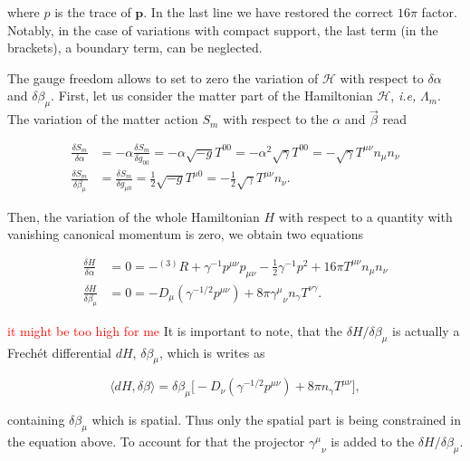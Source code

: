\documentclass[11pt,a4paper,headinclude=true,DIV=14,BCOR=8mm,chapterprefix,listof=totoc,twoside,openright,abstracton]{scrbook}
\newcommand{\red}[1]{\textcolor{red}{#1}}
\begin{document}
where $p$ is the trace of $\boldsymbol{p}$. In the last line we have restored the correct $16\pi$ factor. Notably, in the case of variations with compact support, the last term (in the brackets), a boundary term, can be neglected. 

The gauge freedom allows to set to zero the variation of $\mathcal{H}$ with respect to $\delta \alpha$ and $\delta \beta_{\mu}$. First, let us consider the matter part of the Hamiltonian $\mathcal{H}$, \textit{i.e,} $\Lambda_m$. The variation of the matter action $S_m$ with respect to the $\alpha$ and $\vec{\beta}$ read

\begin{align}
\frac{\delta S_m}{\delta \alpha} &=-\alpha\frac{\delta S_m}{\delta g_{00}} = -\alpha\sqrt{-g}T^{00} = -\alpha^2\sqrt{\gamma}T^{00} = -\sqrt{\gamma}T^{\mu\nu}n_{\mu}n_{\nu} \\
\frac{\delta S_m}{\delta \beta_{\mu}} &= \frac{\delta S_m}{\delta g_{\mu 0}} =\frac{1}{2}\sqrt{-g}T^{\mu 0} = -\frac{1}{2} \sqrt{\gamma}T^{\mu\nu}n_{\nu}.
\end{align}

Then, the variation of the whole Hamiltonian $H$ with respect to a quantity with vanishing canonical momentum is zero, we obtain two equations 

\begin{align}
\frac{\delta H}{\delta \alpha} &= 0 = -{^{(3)}R} + \gamma^{-1}p^{\mu\nu}p_{\mu\nu}-\frac{1}{2}\gamma^{-1}p^2 + 16\pi T^{\mu\nu}n_{\mu}n_{\nu} \\
\frac{\delta H}{\delta \beta_{\mu}} &= 0 = - D_{\mu}(\gamma^{-1/2}p^{\mu\nu}) + 8\pi{\gamma^{\mu}}_{\nu}n_{\gamma}T^{\nu\gamma}.
\label{eq:theory:hamiltonianvariation}
\end{align}

\red{it might be too high for me} It is important to note, that the $\delta H / \delta\beta_{\mu}$ is actually a Frech\'{e}t differential $dH$, $\delta \beta_{\mu}$, which is writes as

\begin{equation}
\langle dH,\delta\beta \rangle = \delta\beta_{\mu}\big[-D_{\nu}(\gamma^{-1/2}p^{\mu\nu})+8\pi n_{\gamma}T^{\mu\nu}\big], 
\end{equation}

containing $\delta\beta_{\mu}$ which is spatial. Thus only the spatial part is being constrained in the equation above. To account for that the projector ${\gamma^{\mu}}_{\nu}$ is added to the $\delta H/\delta \beta_{\mu}$.
\end{document}
